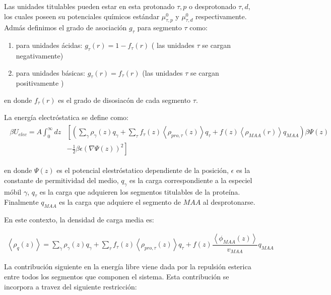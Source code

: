 Las unidades titulables pueden estar en esta protonado $\tau, p$ o desprotonado $\tau, d$, los cuales poseen su potenciales qu\'imicos est\'andar $\mu^0_{\tau,p}$ y $\mu^0_{\tau,d}$ respectivamente. 
Adm\'as definimos el grado de asociaci\'on $g_\tau$ para segmento $\tau$ como:


\begin{enumerate}
	\item para unidades \'acidas: $g_\tau(r) = 1-f_\tau(r)$ ( las unidades $\tau$ se cargan negativamente)
	\item para unidades b\'asicas: $g_\tau(r) = f_\tau(r)$ (las  unidades $\tau$ se cargan positivamente  )
\end{enumerate}
en donde  $f_\tau(r)$ es el grado de disosiac\'on de cada segmento $\tau$.

La energ\'ia electr\'ostatica se define como:
\begin{align}
	\begin{aligned}
		\beta U_{elec}= A\int_0^\infty dz&\left[\left(\sum_{\gamma } {\rho_\gamma(z) q_\gamma + \sum_\tau{f_\tau(z) \left<\rho_{pro,\tau}(z)\right> q_\tau} +  f(z)\left<\rho_{MAA}(r)\right>q_{MAA}}\right)\beta\Psi(z) \right. \\ &\left.-\frac{1}{2}\beta\epsilon(\nabla\Psi(z))^2 \right]
	\end{aligned}
\end{align} 

\noindent en donde $\Psi(z)$ es el potencial elestr\'ostatico dependiente de la posici\'on, $\epsilon$ es la constante de permitividad del medio, $q_\gamma$ es la carga correspondiente a la especiel m\'obil $\gamma$, $q_\tau$ es la carga que adquieren los segmentos titulables de la prote\'ina. Finalmente $q_{MAA}$ es la carga que adquiere el segmento de $MAA$ al desprotonarse.


En este contexto, la densidad de carga media es:

\begin{align}
	\left<\rho_q(z)\right> = \sum_{\gamma } {\rho_\gamma(z) q_\gamma + \sum_\tau{f_\tau(z) \left<\rho_{pro,\tau}(z)\right> q_\tau} +  f(z)\dfrac{\left<\phi_{MAA}(z)\right>}{v_{MAA}}q_{MAA}}
	\label{eq:film:rho_charge}
\end{align}

La contribuci\'on siguiente en la energ\'ia libre viene dada por la repulsi\'on esterica entre  todos los segmentos que componen  el sistema. Esta contribuci\'on se incorpora a travez del siguiente restricci\'on:  

